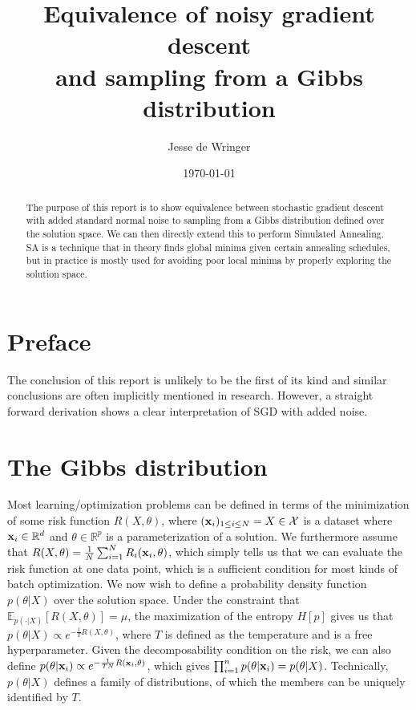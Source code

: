 \documentclass[twocolumn]{article}
\title{Equivalence of noisy gradient descent\\and sampling from a Gibbs distribution}
\author{Jesse de Wringer}
\date{\today}
\begin{document}
\maketitle
\begin{abstract}
The purpose of this report is to show equivalence between stochastic gradient descent with added standard normal noise to sampling from a Gibbs distribution defined over the solution space. We can then directly extend this to perform Simulated Annealing. SA is a technique that in theory finds global minima given certain annealing schedules, but in practice is mostly used for avoiding poor local minima by properly exploring the solution space.
\end{abstract}

\section{Preface}
The conclusion of this report is unlikely to be the first of its kind and similar conclusions are often implicitly mentioned in research. However, a straight forward derivation shows a clear interpretation of SGD with added noise.

\section{The Gibbs distribution}
Most learning/optimization problems can be defined in terms of the minimization of some risk function $R(X, \theta)$, where $(\bold{x}_i)_{1\leq i \leq N} = X\in \mathcal{X}$ is a dataset where $\bold{x}_i \in \mathbb{R}^d$ and $\theta \in \mathbb{R}^p$ is a parameterization of a solution. We furthermore assume that $R(X, \theta) = \frac{1}{N} \sum_{i=1}^NR_i(\bold{x}_i, \theta)$, which simply tells us that we can evaluate the risk function at one data point, which is a sufficient condition for most kinds of batch optimization. We now wish to define a probability density function $p(\theta|X)$ over the solution space. Under the constraint that $\mathbb{E}_{p(\cdot|X)}[R(X, \theta)] = \mu$, the maximization of the entropy $H[p]$ gives us that $p(\theta|X) \propto e^{-\frac{1}{T}R(X, \theta)}$, where $T$ is defined as the temperature and is a free hyperparameter. Given the decomposability condition on the risk, we can also define $p(\theta|\bold{x}_i) \propto e^{-\frac{1}{TN}R(\bold{x}_i, \theta)}$, which gives $\prod_{i=1}^n p(\theta|\bold{x}_i) = p(\theta|X)$. Technically, $p(\theta|X)$ defines a family of distributions, of which the members can be uniquely identified by $T$.
\end{document}
